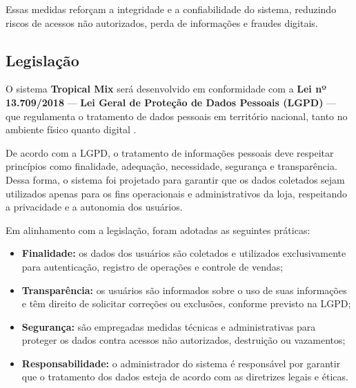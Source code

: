 Essas medidas reforçam a integridade e a confiabilidade do sistema, reduzindo riscos de acessos não autorizados, perda de informações e fraudes digitais.

\subsection{Legislação}

O sistema \textbf{Tropical Mix} será desenvolvido em conformidade com a \textbf{Lei nº 13.709/2018} — \textbf{Lei Geral de Proteção de Dados Pessoais (LGPD)} — que regulamenta o tratamento de dados pessoais em território nacional, tanto no ambiente físico quanto digital \cite{lgpd2018}.  

De acordo com a LGPD, o tratamento de informações pessoais deve respeitar princípios como finalidade, adequação, necessidade, segurança e transparência. Dessa forma, o sistema foi projetado para garantir que os dados coletados sejam utilizados apenas para os fins operacionais e administrativos da loja, respeitando a privacidade e a autonomia dos usuários.  

Em alinhamento com a legislação, foram adotadas as seguintes práticas:

\begin{itemize}
    \item \textbf{Finalidade:} os dados dos usuários são coletados e utilizados exclusivamente para autenticação, registro de operações e controle de vendas;
    \item \textbf{Transparência:} os usuários são informados sobre o uso de suas informações e têm direito de solicitar correções ou exclusões, conforme previsto na LGPD;
    \item \textbf{Segurança:} são empregadas medidas técnicas e administrativas para proteger os dados contra acessos não autorizados, destruição ou vazamentos;
    \item \textbf{Responsabilidade:} o administrador do sistema é responsável por garantir que o tratamento dos dados esteja de acordo com as diretrizes legais e éticas.
\end{itemize}


